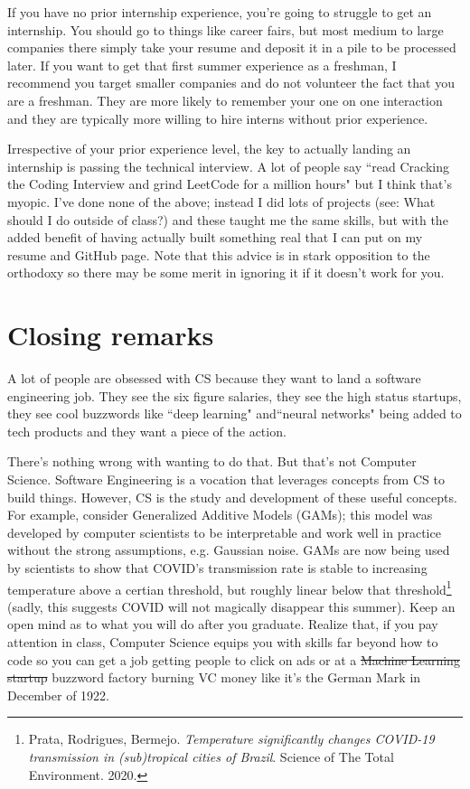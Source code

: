 \documentclass{article}
\begin{document}
If you have no prior internship experience, you're going to struggle to get an internship. You should go to things like career fairs, but most medium to large companies there simply take your resume and deposit it in a pile to be processed later. If you want to get that first summer experience as a freshman, I recommend you target smaller companies and do not volunteer the fact that you are a freshman. They are more likely to remember your one on one interaction and they are typically more willing to hire interns without prior experience.

Irrespective of your prior experience level, the key to actually landing an internship is passing the technical interview. A lot of people say ``read Cracking the Coding Interview and grind LeetCode for a million hours" but I think that's myopic. I've done none of the above; instead I did lots of projects (see: What should I do outside of class?) and these taught me the same skills, but with the added benefit of having actually built something real that I can put on my resume and GitHub page. Note that this advice is in stark opposition to the orthodoxy so there may be some merit in ignoring it if it doesn't work for you.

\section{Closing remarks}
A lot of people are obsessed with CS because they want to land a software engineering job. They see the six figure salaries, they see the high status startups, they see cool buzzwords like ``deep learning" and``neural networks" being added to tech products and they want a piece of the action.

There's nothing wrong with wanting to do that. But that's not Computer Science. Software Engineering is a vocation that leverages concepts from CS to build things. However, CS is the study and development of these useful concepts. For example, consider Generalized Additive Models (GAMs); this model was developed by computer scientists to be interpretable and work well in practice without the strong assumptions, e.g. Gaussian noise. GAMs are now being used by scientists to show that COVID's transmission rate is stable to increasing temperature above a certian threshold, but roughly linear below that threshold\footnote{Prata, Rodrigues, Bermejo. \textit{Temperature significantly changes COVID-19 transmission in (sub)tropical cities of Brazil}. Science of The Total Environment. 2020.} (sadly, this suggests COVID will not magically disappear this summer). Keep an open mind as to what you will do after you graduate. Realize that, if you pay attention in class, Computer Science equips you with skills far beyond how to code so you can get a job getting people to click on ads or at a \sout{Machine Learning startup} buzzword factory burning VC money like it's the German Mark in December of 1922.
\end{document}
